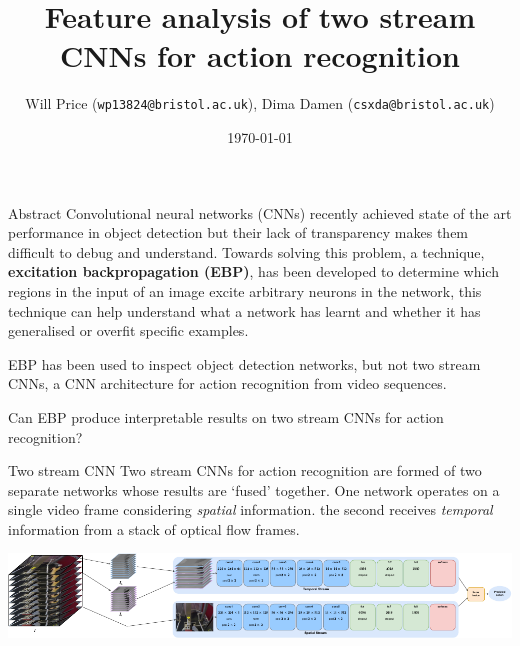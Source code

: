 \documentclass[final]{beamer} %
\title{Feature analysis of two stream CNNs for action recognition}
\author{Will Price (\texttt{wp13824@bristol.ac.uk}), Dima Damen (\texttt{csxda@bristol.ac.uk})}
\institute{University of Bristol}
\date{\today}
\begin{document}
\begin{frame}[t] %
  \setlength{\belowcaptionskip}{2ex} %
  \setlength{\belowdisplayshortskip}{2ex} %

    \begin{alertblock}{Abstract}
      Convolutional neural networks (CNNs) recently achieved state of the art
      performance in object detection but their lack of transparency makes them
      difficult to debug and understand. Towards solving this problem, a
      technique, \textbf{excitation backpropagation (EBP)}, has been developed to
      determine which regions in the input of an image excite arbitrary neurons
      in the network, this technique can help understand what a network has
      learnt and whether it has generalised or overfit specific examples.

      EBP has been used to inspect object detection networks, but not two stream
      CNNs, a CNN architecture for action recognition from video sequences.

      Can EBP produce interpretable results on two stream CNNs for action recognition?
    \end{alertblock}

    \begin{block}{Two stream CNN}
      Two stream CNNs for action recognition are formed of two separate networks
      whose results are `fused' together. One network operates on a single video
      frame considering \textit{spatial} information. the second receives
      \textit{temporal} information from a stack of optical flow frames.

      \vskip0.5cm
      \centering
      \includegraphics[width=\textwidth]{media/images/two-stream-cnn}
    \end{block}


\end{frame}
\end{document}
